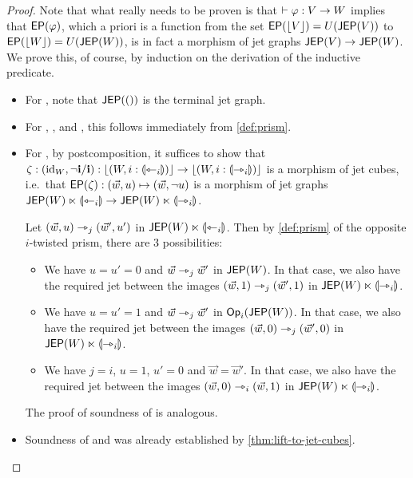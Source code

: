 \documentclass[a4paper]{memoir}
\begin{document}
\begin{proof}
	Note that what really needs to be proven is that $\vdash \varphi : V \to W$ implies that $\mathsf{EP}(\varphi)$, which a priori is a function from the set $\mathsf{EP}(\mathopen{}\left\lfloor V \right\rfloor\mathclose{}) = U(\mathsf{JEP}(V))$ to $\mathsf{EP}(\mathopen{}\left\lfloor W \right\rfloor\mathclose{}) = U(\mathsf{JEP}(W))$, is in fact a morphism of jet graphs $\mathsf{JEP}(V) \to \mathsf{JEP}(W)$.
	We prove this, of course, by induction on the derivation of the inductive predicate.
	
	\begin{itemize}
		\item For , note that $\mathsf{JEP}(())$ is the terminal jet graph.
	
		\item For , ,  and , this follows immediately from \cref{def:prism}.
		
		\item For , by postcomposition, it suffices to show that $\zeta : (\mathrm{id}_W, \lnot \mathbf{i} / \mathbf{i}) : \mathopen{}\left\lfloor (W, i : {\llparenthesis \leftarrowtriangle_i \rrparenthesis}) \right\rfloor\mathclose{} \to \mathopen{}\left\lfloor (W, i : {\llparenthesis \rightarrowtriangle_i \rrparenthesis}) \right\rfloor\mathclose{}$ is a morphism of jet cubes, i.e.\ that $\mathsf{EP}(\zeta) : (\vec w, u) \mapsto (\vec w, \lnot u)$ is a morphism of jet graphs $\mathsf{JEP}(W) \ltimes {\llparenthesis \leftarrowtriangle_i \rrparenthesis} \to \mathsf{JEP}(W) \ltimes {\llparenthesis \rightarrowtriangle_i \rrparenthesis}$.
		
		Let $(\vec w, u) \rightarrowtriangle_j (\vec w', u')$ in $\mathsf{JEP}(W) \ltimes {\llparenthesis \leftarrowtriangle_i \rrparenthesis}$. Then by \cref{def:prism} of the opposite $i$-twisted prism, there are 3 possibilities:
		\begin{itemize}
			\item We have $u = u' = 0$ and $\vec w \rightarrowtriangle_j \vec w'$ in $\mathsf{JEP}(W)$.
			In that case, we also have the required jet between the images $(\vec w, 1) \rightarrowtriangle_j (\vec w', 1)$ in $\mathsf{JEP}(W) \ltimes {\llparenthesis \rightarrowtriangle_i \rrparenthesis}$.
			\item We have $u = u' = 1$ and $\vec w \rightarrowtriangle_j \vec w'$ in ${\mathsf{Op}}_i(\mathsf{JEP}(W))$.
			In that case, we also have the required jet between the images $(\vec w, 0) \rightarrowtriangle_j (\vec w', 0)$ in $\mathsf{JEP}(W) \ltimes {\llparenthesis \rightarrowtriangle_i \rrparenthesis}$.
			\item We have $j = i$, $u = 1$, $u' = 0$ and $\vec w = \vec w'$.
			In that case, we also have the required jet between the images $(\vec w, 0) \rightarrowtriangle_i (\vec w, 1)$ in $\mathsf{JEP}(W) \ltimes {\llparenthesis \rightarrowtriangle_i \rrparenthesis}$.
		\end{itemize}
		The proof of soundness of  is analogous.
		
		\item Soundness of  and  was already established by \cref{thm:lift-to-jet-cubes}.
		

\end{itemize}
\end{proof}
\end{document}
